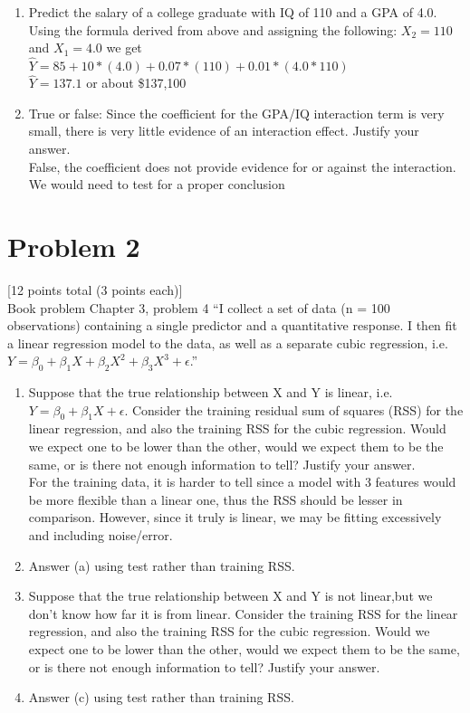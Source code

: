 \documentclass[12pt]{article}
\begin{document}
\begin{enumerate}
    \item Predict the salary of a college graduate with IQ of 110 and a GPA of 4.0.\\
          Using the formula derived from above and assigning the following: $X_2 = 110$ and $X_1 = 4.0$ we get
          $\hat{Y} = 85 + 10 * (4.0) + 0.07 * (110) + 0.01 * (4.0 * 110)$\\
          $\hat{Y} = 137.1$ or about \$137,100
    \item True or false: Since the coefficient for the GPA/IQ interaction term is very small, there is very little evidence of an interaction effect. Justify your answer.\\
          False, the coefficient does not provide evidence for or against the interaction. We would need to test for a proper conclusion
\end{enumerate}


\pagebreak
\section*{Problem 2}
 [12 points total (3 points each)]\\
Book problem Chapter 3, problem 4 “I collect a set of data (n = 100 observations) containing a single predictor and a quantitative response. I then fit a linear regression model to the data, as well as a separate cubic regression, i.e. $Y = \beta_0 + \beta_1X + \beta_2X^2 + \beta_3X^3 + \epsilon$.”

\begin{enumerate}
    \item Suppose that the true relationship between X and Y is linear, i.e. $Y = \beta_0 + \beta_1X + \epsilon$.  Consider the training residual sum of squares (RSS) for the linear regression, and also the training RSS for the cubic regression. Would we expect one to be lower than the other, would we expect them to be the same, or is there not enough information to tell? Justify your answer.\\ For the training data, it is harder to tell since a model with 3 features would be more flexible than a linear one, thus the RSS should be lesser in comparison. However, since it truly is linear, we may be fitting excessively and including noise/error.
    \item Answer (a) using test rather than training RSS.
    \item Suppose that the true relationship between X and Y is not linear,but we don't know how far it is from linear. Consider the training RSS for the linear regression, and also the training RSS for the cubic regression. Would we expect one to be lower than the other, would we expect them to be the same, or is there not enough information to tell? Justify your answer.
    \item Answer (c) using test rather than training RSS.
\end{enumerate}
\end{document}
